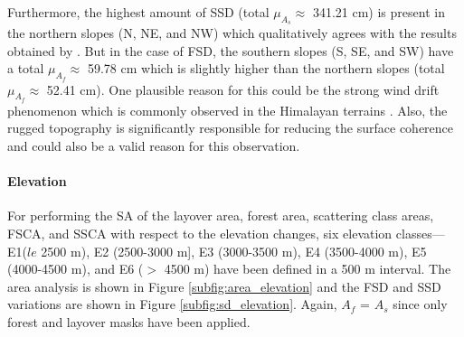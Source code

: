 \documentclass[review]{elsarticle}
\numberwithin{equation}{section}
\numberwithin{figure}{section}
\numberwithin{table}{section}
\begin{document}
Furthermore, the highest amount of SSD (total $\mu_{A_s} \approx$ 341.21 cm) is present in the northern slopes (N, NE, and NW) which qualitatively agrees with the results obtained by \cite{Jain2009}. But in the case of FSD, the southern slopes (S, SE, and SW) have a total $\mu_{A_f} \approx$ 59.78 cm which is slightly higher than the northern slopes (total $\mu_{A_f} \approx$ 52.41 cm). One plausible reason for this could be the strong wind drift phenomenon which is commonly observed in the Himalayan terrains \citep{Jain2009, Lehning2008}. Also, the rugged topography is significantly responsible for reducing the surface coherence \citep{Leinss2014} and could also be a valid reason for this observation.

\paragraph*{Elevation}

For performing the SA of the layover area, forest area, scattering class areas, FSCA, and SSCA with respect to the elevation changes, six elevation classes— E1($le$ 2500 m), E2 (2500-3000 m], E3 (3000-3500 m), E4 (3500-4000 m), E5 (4000-4500 m), and E6 ($>$ 4500 m) have been defined in a 500 m interval. The area analysis is shown in Figure \ref{subfig:area_elevation} and the FSD and SSD variations are shown in Figure \ref{subfig:sd_elevation}. Again, $A_f$ = $A_s$ since only forest and layover masks have been applied.
\end{document}
